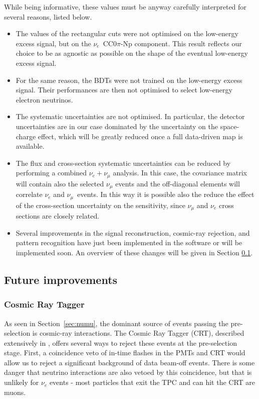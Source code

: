 While being informative, these values must be anyway carefully interpreted for several reasons, listed below.
\begin{itemize}
    \item The values of the rectangular cuts were not optimised on the low-energy excess signal, but on the $\nu_e$~CC0$\pi$-Np component. This result reflects our choice to be as agnostic as possible on the shape of the eventual low-energy excess signal.
    \item For the same reason, the BDTs were not trained on the low-energy excess signal. Their performances are then not optimised to select low-energy electron neutrinos.
    \item The systematic uncertainties are not optimised. In particular, the detector uncertainties are in our case dominated by the uncertainty on the space-charge effect, which will be greatly reduced once a full data-driven map is available.
    \item The flux and cross-section systematic uncertainties can be reduced by performing a combined $\nu_e+\nu_{\mu}$ analysis. In this case, the covariance matrix will contain also the selected $\nu_{\mu}$ events and the off-diagonal elements will correlate $\nu_e$ and $\nu_{\mu}$~events. In this way it is possible also the reduce the effect of the cross-section uncertainty on the sensitivity, since $\nu_{\mu}$ and $\nu_e$ cross sections are closely related.
    \item Several improvements in the signal reconstruction, cosmic-ray rejection, and pattern recognition have just been implemented in the software or will be implemented soon. An overview of these changes will be given in Section \ref{sec:improvements}.
\end{itemize}

\subsection{Future improvements}\label{sec:improvements}
\subsubsection*{Cosmic Ray Tagger}
As seen in Section~\ref{sec:numu}, the dominant source of events passing the pre-selection is cosmic-ray interactions.  The Cosmic Ray Tagger (CRT), described extensively in \cite{Auger:2016tjc}, offers several ways to reject these events at the pre-selection stage. First, a coincidence veto of in-time flashes in the PMTs and CRT would allow us to reject a significant background of data beam-off events.  There is some danger that neutrino interactions are also vetoed by this coincidence, but that is unlikely for $\nu_{e}$ events - most particles that exit the TPC and can hit the CRT are muons.

